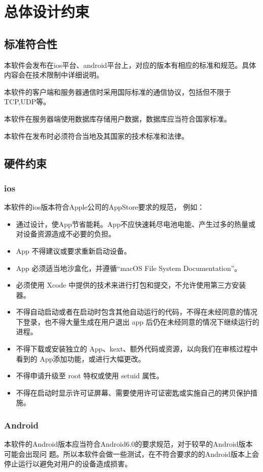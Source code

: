 \chapter{总体设计约束}
\section{标准符合性}
\item 本软件会发布在ios平台、android平台上，对应的版本有相应的标准和规范。具体内容会在技术限制中详细说明。
\item 本软件的客户端和服务器通信时采用国际标准的通信协议，包括但不限于TCP,UDP等。
\item 本软件在服务器端使用数据库存储用户数据，数据库应当符合国家标准。
\item 本软件在发布时必须符合当地及其国家的技术标准和法律。

\section{硬件约束}
\subsection{ios}
本软件的ios版本符合Apple公司的AppStore要求的规范，
例如：
\begin{itemize}
  \item 通过设计，使App节省能耗。App不应快速耗尽电池电能、产生过多的热量或对设备资源造成不必要的负担。
  \item App 不得建议或要求重新启动设备。
  \item App 必须适当地沙盒化，并遵循“macOS File System Documentation”。
  \item 必须使用 Xcode 中提供的技术来进行打包和提交，不允许使用第三方安装器。
  \item 不得自动启动或者在启动时包含其他自动运行的代码，不得在未经同意的情况下登录，也不得大量生成在用户退出 app 后仍在未经同意的情况下继续运行的进程。
  \item 不得下载或安装独立的 App、kext、额外代码或资源，以向我们在审核过程中看到的 App添加功能，或进行大幅更改。
  \item 不得申请升级至 root 特权或使用 setuid 属性。
  \item 不得在启动时显示许可证屏幕、需要使用许可证密匙或实施自己的拷贝保护措施。
\end{itemize}

\subsection{Android}
本软件的Android版本应当符合Android6.0的要求规范，对于较早的Android版本可能会出现问
题。所以本软件会做一些测试，在不符合要求的的Android版本上会停止运行以避免对用户的设备造成损害。



